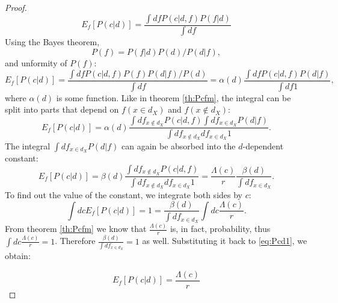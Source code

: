 \documentclass[a4paper]{article}
\begin{document}
\begin{proof}
  \begin{equation}
    E_f\left[P(c|d)\right] = \frac{\int df P(c|d,f) P(f|d)}{\int df}
  \end{equation}
  Using the Bayes theorem,
  \begin{equation}
    P(f) =  P(f|d) P(d) / P(d|f),
  \end{equation}
  and unformity of $P(f)$:
  \begin{equation}
    E_f\left[P(c|d)\right] = \frac{\int df P(c|d,f) P(f) P(d|f) / P(d)}{\int df} = \alpha(d)
      \frac{\int df P(c|d,f) P(d|f)}{\int df 1},
  \end{equation}
  where $\alpha(d)$ is some function. Like in theorem \ref{th:Pcfm},
  the integral can be split into parts that depend on
  $f\left(x\in d_X\right)$ and $f\left(x\notin d_X\right)$:
  \begin{equation}
    E_f\left[P(c|d)\right] = \alpha(d) \frac{\int df_{x\notin d_X} P\left(c|d,f \right)
      \int df_{x \in d_X} P\left(d|f\right)}{\int df_{x\notin d_X} df_{x \in d_X} 1}.
  \end{equation}
  The integral $\int df_{x \in d_X} P\left(d|f\right)$ can again be
  absorbed into the $d$-dependent constant:
  \begin{equation}
    E_f\left[P(c|d)\right] = \beta(d) \frac{\int df_{x\notin d_X} P\left(c|d,f \right)
    }{\int df_{x\notin d_X} df_{x \in d_X} 1} = \frac{\Lambda(c)}{r} \frac{\beta(d)}{\int df_{x \in d_X}}.
    \label{eq:Pcd1}
  \end{equation}
  To find out the value of the constant, we integrate both sides by $c$:
  \begin{equation}
    \int dc E_f\left[P(c|d)\right] = 1 = \frac{\beta(d)}{\int df_{x \in d_X}}
    \int dc \frac{\Lambda(c)}{r}.
  \end{equation}
  From theorem \ref{th:Pcfm} we know that $\frac{\Lambda(c)}{r}$ is,
  in fact, probability, thus $\int dc \frac{\Lambda(c)}{r} =
  1$. Therefore $\frac{\beta(d)}{\int df_{x \in d_X}} = 1$ as
  well. Substituting it back to \ref{eq:Pcd1}, we obtain:
  
  \begin{equation}
    E_f\left[P(c|d)\right] =  \frac{\Lambda(c)}{r}
  \end{equation}
  
\end{proof}
\end{document}
